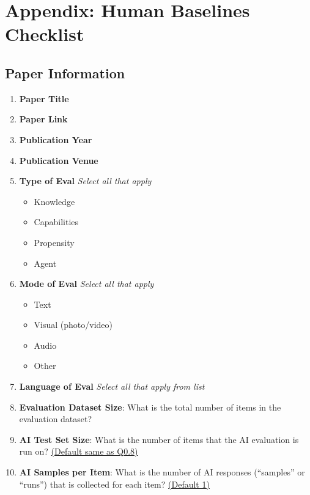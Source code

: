 \documentclass{article}
\begin{document}
\section*{Appendix: Human Baselines Checklist}
\label{sec:Appendix_Checklist}

\setcounter{subsection}{-1}
\subsection{Paper Information}

\renewcommand{\labelenumi}{0.\arabic{enumi}}
\renewcommand{\labelenumii}{0.\arabic{enumi}.\arabic{enumii}}
\renewcommand{\labelenumiii}{0.\arabic{enumi}.\arabic{enumii}.\arabic{enumiii}}

\begin{enumerate}[leftmargin=30pt, topsep=0pt, itemsep=0pt]
    \item \textbf{Paper Title}
    
    \item \textbf{Paper Link}
    
    \item \textbf{Publication Year}
    
    \item \textbf{Publication Venue}
    
    \item \textbf{Type of Eval} 
    \newline \textit{Select all that apply}
    \begin{itemize}
        \item Knowledge
        \item Capabilities
        \item Propensity
        \item Agent
    \end{itemize}
    
    \item \textbf{Mode of Eval}
    \newline \textit{Select all that apply}
    \begin{itemize}
        \item Text
        \item Visual (photo/video)
        \item Audio
        \item Other
    \end{itemize}
    
    \item \textbf{Language of Eval} 
    \newline \textit{Select all that apply from list}
    
    \item \textbf{Evaluation Dataset Size}: What is the total number of items in the evaluation dataset? 
    
    \item \textbf{AI Test Set Size}: What is the number of items that the AI evaluation is run on? \ul{(Default same as Q0.8)}
    
    \item \textbf{AI Samples per Item}: What is the number of AI responses (``samples'' or ``runs'') that is collected for each item? \ul{(Default 1)} 
\end{enumerate}
\end{document}
